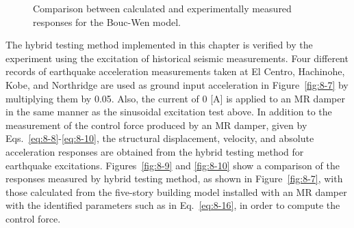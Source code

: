 \begin{figure}[H]
\centering
{}
\caption{Comparison between calculated and experimentally measured responses for the Bouc-Wen model.}
\label{fig:8-8}
\end{figure}

The hybrid testing method implemented in this chapter is verified by the experiment using the excitation of historical seismic measurements. Four different records of earthquake acceleration measurements taken at El Centro, Hachinohe, Kobe, and Northridge are used as ground input acceleration in Figure~\ref{fig:8-7} by multiplying them by 0.05. Also, the current of 0 [A] is applied to an MR damper in the same manner as the sinusoidal excitation test above. In addition to the measurement of the control force produced by an MR damper, given by Eqs.~\eqref{eq:8-8}-\eqref{eq:8-10}, the structural displacement, velocity, and absolute acceleration responses are obtained from the hybrid testing method for earthquake excitations. Figures~\ref{fig:8-9} and \ref{fig:8-10} show a comparison of the responses measured by hybrid testing method, as shown in Figure~\ref{fig:8-7}, with those calculated from the five-story building model installed with an MR damper with the identified parameters such as in Eq.~\eqref{eq:8-16}, in order to compute the control force. 

